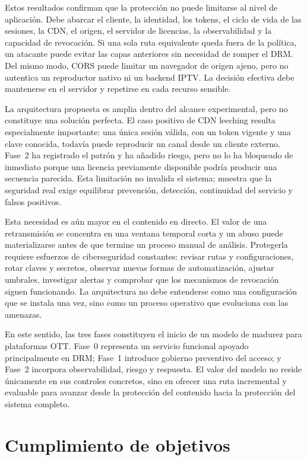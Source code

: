Estos resultados confirman que la protección no puede limitarse al nivel de aplicación. Debe abarcar el cliente, la identidad, los tokens, el ciclo de vida de las sesiones, la CDN, el origen, el servidor de licencias, la observabilidad y la capacidad de revocación. Si una sola ruta equivalente queda fuera de la política, un atacante puede evitar las capas anteriores sin necesidad de romper el DRM. Del mismo modo, CORS puede limitar un navegador de origen ajeno, pero no autentica un reproductor nativo ni un backend IPTV. La decisión efectiva debe mantenerse en el servidor y repetirse en cada recurso sensible.

La arquitectura propuesta es amplia dentro del alcance experimental, pero no constituye una solución perfecta. El caso positivo de CDN leeching resulta especialmente importante: una única sesión válida, con un token vigente y una clave conocida, todavía puede reproducir un canal desde un cliente externo. Fase~2 ha registrado el patrón y ha añadido riesgo, pero no lo ha bloqueado de inmediato porque una licencia previamente disponible podría producir una secuencia parecida. Esta limitación no invalida el sistema; muestra que la seguridad real exige equilibrar prevención, detección, continuidad del servicio y falsos positivos.

Esta necesidad es aún mayor en el contenido en directo. El valor de una retransmisión se concentra en una ventana temporal corta y un abuso puede materializarse antes de que termine un proceso manual de análisis. Protegerla requiere esfuerzos de ciberseguridad constantes: revisar rutas y configuraciones, rotar claves y secretos, observar nuevas formas de automatización, ajustar umbrales, investigar alertas y comprobar que los mecanismos de revocación siguen funcionando. La arquitectura no debe entenderse como una configuración que se instala una vez, sino como un proceso operativo que evoluciona con las amenazas.

En este sentido, las tres fases constituyen el inicio de un modelo de madurez para plataformas OTT. Fase~0 representa un servicio funcional apoyado principalmente en DRM; Fase~1 introduce gobierno preventivo del acceso; y Fase~2 incorpora observabilidad, riesgo y respuesta. El valor del modelo no reside únicamente en sus controles concretos, sino en ofrecer una ruta incremental y evaluable para avanzar desde la protección del contenido hacia la protección del sistema completo.

\section{Cumplimiento de objetivos}

